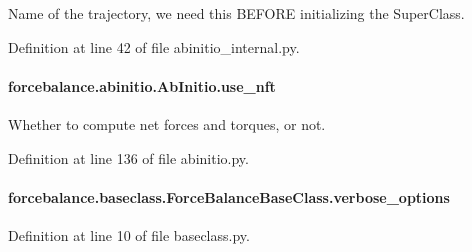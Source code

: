 Name of the trajectory, we need this B\-E\-F\-O\-R\-E initializing the Super\-Class. 



Definition at line 42 of file abinitio\-\_\-internal.\-py.

\hypertarget{classforcebalance_1_1abinitio_1_1AbInitio_afd8d179560a295ffa6c6309843c59279}{
\paragraph[{use\-\_\-nft}]{\setlength{\rightskip}{0pt plus 5cm}forcebalance.\-abinitio.\-Ab\-Initio.\-use\-\_\-nft\hspace{0.3cm}{\ttfamily [inherited]}}}\label{classforcebalance_1_1abinitio_1_1AbInitio_afd8d179560a295ffa6c6309843c59279}


Whether to compute net forces and torques, or not. 



Definition at line 136 of file abinitio.\-py.

\hypertarget{classforcebalance_1_1baseclass_1_1ForceBalanceBaseClass_a8088e1e20cbd6bc175fb9c9fe9fa0f18}{
\paragraph[{verbose\-\_\-options}]{\setlength{\rightskip}{0pt plus 5cm}forcebalance.\-baseclass.\-Force\-Balance\-Base\-Class.\-verbose\-\_\-options\hspace{0.3cm}{\ttfamily [inherited]}}}\label{classforcebalance_1_1baseclass_1_1ForceBalanceBaseClass_a8088e1e20cbd6bc175fb9c9fe9fa0f18}


Definition at line 10 of file baseclass.\-py.

